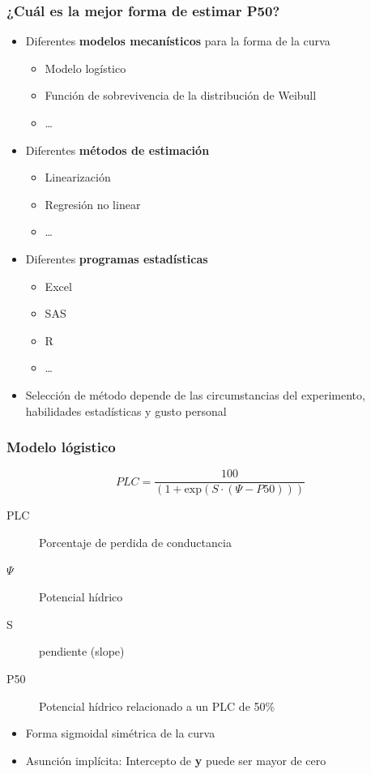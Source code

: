 \documentclass[usepdftitle=false]{beamer}
\newcommand{\Blue}[1]{{\color{blue!50!black}\textbf{#1}}}
\begin{document}
	
\begin{frame}
\frametitle{¿Cuál es la mejor forma de estimar P50?}
\begin{itemize}
  \item Diferentes \Blue{modelos mecanísticos} para la forma de la curva
  \begin{itemize}
	\item Modelo logístico 
	\item Función de sobrevivencia de la distribución de Weibull
    \item \dots 
  \end{itemize}
  \item<2-> Diferentes \Blue{métodos de estimación}
  \begin{itemize}
    \item Linearización
	\item Regresión no linear
	\item \dots
  \end{itemize}
  \item<3-> Diferentes \Blue{programas estadísticas}
  \begin{itemize}
    \item Excel
	\item SAS
	\item R
	\item \dots
  \end{itemize}	
  \item<visible@4| alert@4> Selección de método depende de las circumstancias del experimento, habilidades estadísticas y gusto personal	
\end{itemize}		
\end{frame}

\begin{frame}
\frametitle{Modelo lógistico}
\centering
\begin{equation*}
PLC = \frac{100}{(1 + \mathrm{exp}(S\cdot(\Psi - P50)))}
\end{equation*}
\begin{description}
  \item[PLC] Porcentaje de perdida de conductancia
  \item[$\Psi$] Potencial hídrico
  \item[S]   pendiente (slope)
  \item[P50] Potencial hídrico relacionado a un PLC de 50\% 
\end{description}
\begin{itemize}
	\item<2-> Forma sigmoidal simétrica de la curva
	\item<3-> Asunción implícita: Intercepto de \textbf{y} puede ser mayor de cero   
\end{itemize}
\end{frame}
\end{document}
